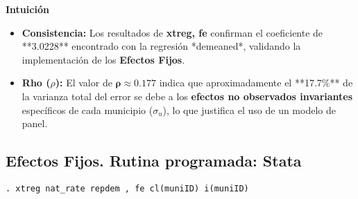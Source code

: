 \documentclass[12pt]{article}
\begin{document}
\vspace{0.3cm}

\noindent\textbf{Intuición}
\begin{itemize}
    \item \textbf{Consistencia:} Los resultados de \textbf{xtreg, fe} confirman el coeficiente de **3.0228** encontrado con la regresión *demeaned*, validando la implementación de los \textbf{Efectos Fijos}.
    \item \textbf{Rho ($\rho$):} El valor de $\mathbf{\rho \approx 0.177}$ indica que aproximadamente el **17.7\%** de la varianza total del error se debe a los \textbf{efectos no observados invariantes} específicos de cada municipio ($\sigma_u$), lo que justifica el uso de un modelo de panel.
\end{itemize}

\subsection*{\noindent\textbf{Efectos Fijos. Rutina programada: Stata}}

\begin{verbatim}
. xtreg nat_rate repdem , fe cl(muniID) i(muniID)
\end{verbatim}
\end{document}
